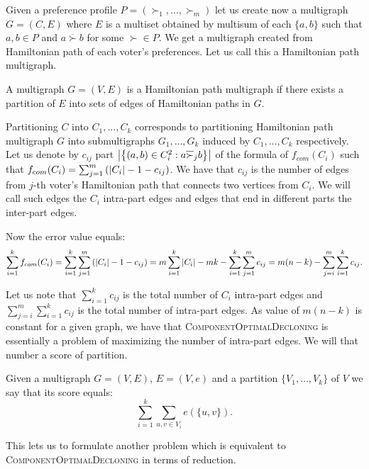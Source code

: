 Given a preference profile $P = (\succ_1, ..., \succ_m)$ let us create now a multigraph $G=(C,E)$
where $E$ is a multiset obtained by multisum
of each $\{a,b\}$ such that $a,b \in P$ and $a \overline{\succ} b$ for some $\succ \in P$.
We get a multigraph created from Hamiltonian path of each voter's preferences.
Let us call this a Hamiltonian path multigraph.

\begin{defn}
A multigraph $G=(V,E)$ is a Hamiltonian path multigraph if there exists a partition of $E$
into sets of edges of Hamiltonian paths in $G$.
\end{defn}

Partitioning $C$ into $C_1,...,C_k$ corresponds to
partitioning Hamiltonian path multigraph $G$ into submultigraphs $G_1,...,G_k$
induced by $C_1,...,C_k$ respectively.
Let us denote by $c_{ij}$ part
$\left\vert \left\lbrace \left( a,b \right) \in C_i^2 : a \overline{\succ}_j b \right\rbrace  \right\vert$
of the formula of $f_{com}(C_i)$ such that
$f_{com}(C_i) = \sum_{j=1}^m \left( \left\vert C_i \right\vert - 1 - c_{ij} \right)$.
We have that $c_{ij}$ is the number of edges from $j$-th voter's Hamiltonian path
that connects two vertices from $C_i$.
We will call such edges the $C_i$ intra-part edges and edges that end in different parts the inter-part edges.

Now the error value equals:
$$
\sum_{i=1}^k f_{com}(C_i) =
\sum_{i=1}^k \sum_{j=1}^m \left( \left\vert C_i \right\vert - 1 - c_{ij} \right) =
m \sum_{i=1}^k \left\vert C_i \right\vert - m k - \sum_{i=1}^k \sum_{j=1}^m c_{ij} =
m(n-k) - \sum_{j=i}^m \sum_{i=1}^k c_{ij}
\text{.}$$

Let us note that $\sum_{i=1}^k c_{ij}$ is the total number of $C_i$ intra-part edges
and $\sum_{j=i}^m \sum_{i=1}^k c_{ij}$ is the total number of intra-part edges.
As value of $m(n-k)$ is constant for a given graph,
we have that \textsc{ComponentOptimalDecloning} is essentially a problem of maximizing the number of intra-part edges.
We will that number a score of partition.

\begin{defn}
Given a multigraph $G=(V,E)$, $E=(V,e)$ and a partition $\{V_1, ..., V_k\}$ of $V$
we say that its score equals:
$$\sum_{i=1}^k \sum_{u,v \in V_i} e(\{u,v\}) \text{.}$$
\end{defn}

This lets us to formulate another problem which is equivalent to \textsc{ComponentOptimalDecloning}
in terms of reduction.

